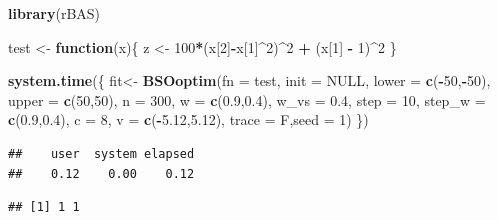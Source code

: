 \documentclass[]{ctexbook}
\newenvironment{Shaded}{\begin{snugshade}}{\end{snugshade}}
\newcommand{\KeywordTok}[1]{\textcolor[rgb]{0.13,0.29,0.53}{\textbf{#1}}}
\newcommand{\DataTypeTok}[1]{\textcolor[rgb]{0.13,0.29,0.53}{#1}}
\newcommand{\DecValTok}[1]{\textcolor[rgb]{0.00,0.00,0.81}{#1}}
\newcommand{\FloatTok}[1]{\textcolor[rgb]{0.00,0.00,0.81}{#1}}
\newcommand{\StringTok}[1]{\textcolor[rgb]{0.31,0.60,0.02}{#1}}
\newcommand{\OtherTok}[1]{\textcolor[rgb]{0.56,0.35,0.01}{#1}}
\newcommand{\ControlFlowTok}[1]{\textcolor[rgb]{0.13,0.29,0.53}{\textbf{#1}}}
\newcommand{\OperatorTok}[1]{\textcolor[rgb]{0.81,0.36,0.00}{\textbf{#1}}}
\newcommand{\NormalTok}[1]{#1}
\begin{document}
\begin{Shaded}
\begin{Highlighting}[]
\KeywordTok{library}\NormalTok{(rBAS)}

\NormalTok{test <-}\StringTok{ }\ControlFlowTok{function}\NormalTok{(x)\{}
\NormalTok{  z <-}\StringTok{ }\DecValTok{100}\OperatorTok{*}\NormalTok{(x[}\DecValTok{2}\NormalTok{]}\OperatorTok{-}\NormalTok{x[}\DecValTok{1}\NormalTok{]}\OperatorTok{^}\DecValTok{2}\NormalTok{)}\OperatorTok{^}\DecValTok{2} \OperatorTok{+}\StringTok{ }\NormalTok{(x[}\DecValTok{1}\NormalTok{] }\OperatorTok{-}\StringTok{ }\DecValTok{1}\NormalTok{)}\OperatorTok{^}\DecValTok{2}
\NormalTok{\}}

\KeywordTok{system.time}\NormalTok{(\{}
\NormalTok{  fit<-}
\StringTok{    }\KeywordTok{BSOoptim}\NormalTok{(}\DataTypeTok{fn =}\NormalTok{ test,}
             \DataTypeTok{init =} \OtherTok{NULL}\NormalTok{,}
             \DataTypeTok{lower =} \KeywordTok{c}\NormalTok{(}\OperatorTok{-}\DecValTok{50}\NormalTok{,}\OperatorTok{-}\DecValTok{50}\NormalTok{),}
             \DataTypeTok{upper =} \KeywordTok{c}\NormalTok{(}\DecValTok{50}\NormalTok{,}\DecValTok{50}\NormalTok{),}
             \DataTypeTok{n =} \DecValTok{300}\NormalTok{,}
             \DataTypeTok{w =} \KeywordTok{c}\NormalTok{(}\FloatTok{0.9}\NormalTok{,}\FloatTok{0.4}\NormalTok{),}
             \DataTypeTok{w_vs =} \FloatTok{0.4}\NormalTok{, }
             \DataTypeTok{step =} \DecValTok{10}\NormalTok{,}
             \DataTypeTok{step_w =} \KeywordTok{c}\NormalTok{(}\FloatTok{0.9}\NormalTok{,}\FloatTok{0.4}\NormalTok{),}
             \DataTypeTok{c =} \DecValTok{8}\NormalTok{,}
             \DataTypeTok{v =} \KeywordTok{c}\NormalTok{(}\OperatorTok{-}\FloatTok{5.12}\NormalTok{,}\FloatTok{5.12}\NormalTok{),}
             \DataTypeTok{trace =}\NormalTok{ F,}\DataTypeTok{seed =} \DecValTok{1}\NormalTok{)}
\NormalTok{\})}
\end{Highlighting}
\end{Shaded}

\begin{verbatim}
##    user  system elapsed 
##    0.12    0.00    0.12
\end{verbatim}

\begin{Shaded}
\end{Shaded}

\begin{verbatim}
## [1] 1 1
\end{verbatim}
\end{document}
